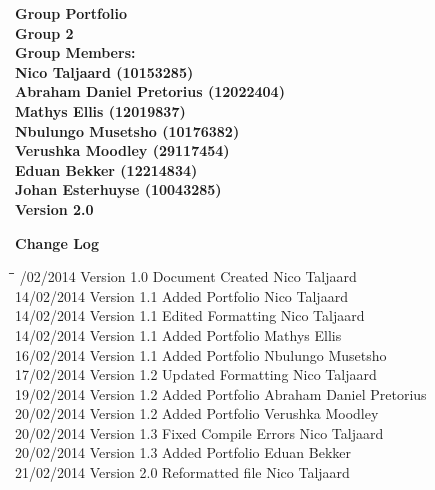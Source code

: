 \documentclass[12pt]{article}
\newcommand{\Title}{Group Portfolio} %
\begin{document}
	\begin{center}%
	
	  \LARGE \bf \Title \\[4em]
	  \LARGE {\bf Group 2}\\[1em]
	  \LARGE {\bf Group Members:}\\[2em]
	  \large
	      Nico Taljaard					(10153285) \\[1em]
	      Abraham Daniel Pretorius		(12022404) \\[1em]
	      Mathys Ellis					(12019837) \\[1em]
	      Nbulungo Musetsho				(10176382) \\[1em]
	      Verushka Moodley				(29117454) \\[1em]
	      Eduan Bekker					(12214834) \\[8em]
	      Johan Esterhuyse				(10043285) \\[1em]
	      {\bf Version 2.0}	    
	\end{center}%
	
	\newpage
	{\LARGE \bf Change Log}\\[2em]	
		\begin{tabbing}
			\hspace*{3cm}\=\hspace*{3cm}\=\hspace*{8cm}\=\hspace*{3cm} /02/2014 \> Version 1.0 \> Document Created \> Nico Taljaard\\
			14/02/2014 \> Version 1.1 \> Added Portfolio \> Nico Taljaard\\
			14/02/2014 \> Version 1.1 \> Edited Formatting \> Nico Taljaard\\
			14/02/2014 \> Version 1.1 \> Added Portfolio \> Mathys Ellis\\
			16/02/2014 \> Version 1.1 \> Added Portfolio \> Nbulungo Musetsho\\
			17/02/2014 \> Version 1.2 \> Updated Formatting \> Nico Taljaard\\
			19/02/2014 \> Version 1.2 \> Added Portfolio \> Abraham Daniel Pretorius\\
			20/02/2014 \> Version 1.2 \> Added Portfolio \> Verushka Moodley\\
			20/02/2014 \> Version 1.3 \> Fixed Compile Errors \> Nico Taljaard\\
			20/02/2014 \> Version 1.3 \> Added Portfolio \> Eduan Bekker\\
			21/02/2014 \> Version 2.0 \> Reformatted file \> Nico Taljaard\\
		\end{tabbing}
\end{document}
